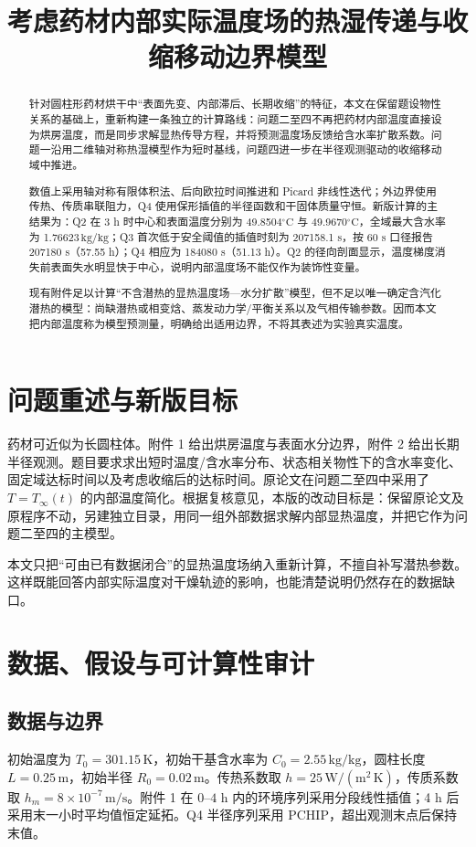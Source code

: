 \documentclass[withoutpreface,bwprint]{cumcmthesis}
\title{考虑药材内部实际温度场的热湿传递与收缩移动边界模型}
\newcommand{\kgkg}{\ensuremath{\mathrm{kg/kg}}}
\begin{document}
\maketitle

\begin{abstract}
针对圆柱形药材烘干中“表面先变、内部滞后、长期收缩”的特征，本文在保留题设物性关系的基础上，重新构建一条独立的计算路线：问题二至四不再把药材内部温度直接设为烘房温度，而是同步求解显热传导方程，并将预测温度场反馈给含水率扩散系数。问题一沿用二维轴对称热湿模型作为短时基线，问题四进一步在半径观测驱动的收缩移动域中推进。

数值上采用轴对称有限体积法、后向欧拉时间推进和 Picard 非线性迭代；外边界使用传热、传质串联阻力，Q4 使用保形插值的半径函数和干固体质量守恒。新版计算的主结果为：Q2 在 3 h 时中心和表面温度分别为 49.8504\(^{\circ}\mathrm C\) 与 49.9670\(^{\circ}\mathrm C\)，全域最大含水率为 1.76623\,\kgkg；Q3 首次低于安全阈值的插值时刻为 207158.1 s，按 60 s 口径报告 207180 s（57.55 h）；Q4 相应为 184080 s（51.13 h）。Q2 的径向剖面显示，温度梯度消失前表面失水明显快于中心，说明内部温度场不能仅作为装饰性变量。

现有附件足以计算“不含潜热的显热温度场—水分扩散”模型，但不足以唯一确定含汽化潜热的模型：尚缺潜热或相变焓、蒸发动力学/平衡关系以及气相传输参数。因而本文把内部温度称为模型预测量，明确给出适用边界，不将其表述为实验真实温度。
\end{abstract}

\section{问题重述与新版目标}
药材可近似为长圆柱体。附件 1 给出烘房温度与表面水分边界，附件 2 给出长期半径观测。题目要求求出短时温度/含水率分布、状态相关物性下的含水率变化、固定域达标时间以及考虑收缩后的达标时间。原论文在问题二至四中采用了 $T=T_\infty(t)$ 的内部温度简化。根据复核意见，本版的改动目标是：保留原论文及原程序不动，另建独立目录，用同一组外部数据求解内部显热温度，并把它作为问题二至四的主模型。

本文只把“可由已有数据闭合”的显热温度场纳入重新计算，不擅自补写潜热参数。这样既能回答内部实际温度对干燥轨迹的影响，也能清楚说明仍然存在的数据缺口。

\section{数据、假设与可计算性审计}
\subsection{数据与边界}
初始温度为 $T_0=301.15\,\mathrm K$，初始干基含水率为 $C_0=2.55\,\kgkg$，圆柱长度 $L=0.25\,\mathrm m$，初始半径 $R_0=0.02\,\mathrm m$。传热系数取 $h=25\,\mathrm{W/(m^2\,K)}$，传质系数取 $h_m=8\times10^{-7}\,\mathrm{m/s}$。附件 1 在 $0$--$4$ h 内的环境序列采用分段线性插值；4 h 后采用末一小时平均值恒定延拓。Q4 半径序列采用 PCHIP，超出观测末点后保持末值。
\end{document}
